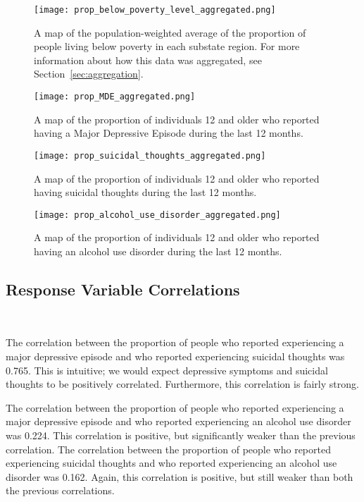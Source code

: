 \documentclass{article}
\begin{document}
\begin{figure}[!htb]
    \centering
    \texttt{[image: prop\_below\_poverty\_level\_aggregated.png]}
    \caption{\label{fig:map-poverty}A map of the population-weighted average of the proportion of
    people living below poverty in each substate region.
	For more information about how this data was aggregated,
	see Section~\ref{sec:aggregation}.
	}
\end{figure}

\begin{figure}[!htb]
    \centering
    \texttt{[image: prop\_MDE\_aggregated.png]}
    \caption{\label{fig:map-MDE}
    A map of the proportion of individuals 12 and older who
	reported having a Major Depressive Episode during the last 12 months.}
\end{figure}

\begin{figure}[!htb]
    \centering
    \texttt{[image: prop\_suicidal\_thoughts\_aggregated.png]}
    \caption{\label{fig:map-suicidal-thoughts}
    A map of the proportion of individuals 12 and older who
	reported having suicidal thoughts during the last 12 months.}
\end{figure}

\begin{figure}[!htb]
    \centering
    \texttt{[image: prop\_alcohol\_use\_disorder\_aggregated.png]}
    \caption{\label{fig:map-alcohol-use}
    A map of the proportion of individuals 12 and older who
	reported having an alcohol use disorder during the last 12 months.}
\end{figure}

\subsection{Response Variable Correlations}~\label{sec:results-corr}

The correlation between the proportion of people who reported experiencing
a major depressive episode and
who reported experiencing suicidal thoughts was
0.765.
This is intuitive; we would expect depressive symptoms and suicidal thoughts
to be positively correlated.
Furthermore, this correlation is fairly strong.

The correlation between the proportion of people who reported experiencing
a major depressive episode and
who reported experiencing an alcohol use disorder was
0.224.
This correlation is positive, but significantly weaker than
the previous correlation.
The correlation between the proportion of people who reported experiencing
suicidal thoughts and
who reported experiencing an alcohol use disorder was
0.162.
Again, this correlation is positive, but still weaker than
both the previous correlations.
\end{document}

